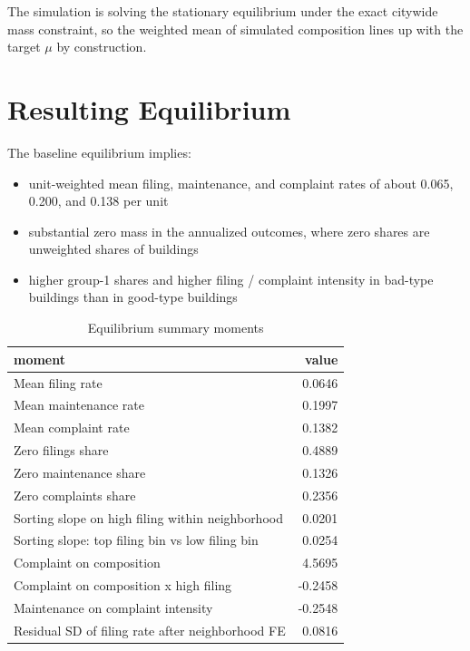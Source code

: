 \documentclass[
  11pt,
]{article}
\providecommand{\tightlist}{%
  \setlength{\itemsep}{0pt}\setlength{\parskip}{0pt}}
\begin{document}
The simulation is solving the stationary equilibrium under the exact
citywide mass constraint, so the weighted mean of simulated composition
lines up with the target \(\mu\) by construction.

\section{Resulting Equilibrium}\label{resulting-equilibrium}

The baseline equilibrium implies:

\begin{itemize}
\tightlist
\item
  unit-weighted mean filing, maintenance, and complaint rates of about
  0.065, 0.200, and 0.138 per unit
\item
  substantial zero mass in the annualized outcomes, where zero shares
  are unweighted shares of buildings
\item
  higher group-1 shares and higher filing / complaint intensity in
  bad-type buildings than in good-type buildings
\end{itemize}

\begin{table}

\caption{Equilibrium summary moments}
\centering
\begin{tabular}[t]{lr}
\toprule
moment & value\\
\midrule
Mean filing rate & 0.0646\\
Mean maintenance rate & 0.1997\\
Mean complaint rate & 0.1382\\
Zero filings share & 0.4889\\
Zero maintenance share & 0.1326\\
Zero complaints share & 0.2356\\
Sorting slope on high filing within neighborhood & 0.0201\\
Sorting slope: top filing bin vs low filing bin & 0.0254\\
Complaint on composition & 4.5695\\
Complaint on composition x high filing & -0.2458\\
Maintenance on complaint intensity & -0.2548\\
Residual SD of filing rate after neighborhood FE & 0.0816\\
\bottomrule
\end{tabular}
\end{table}
\end{document}
